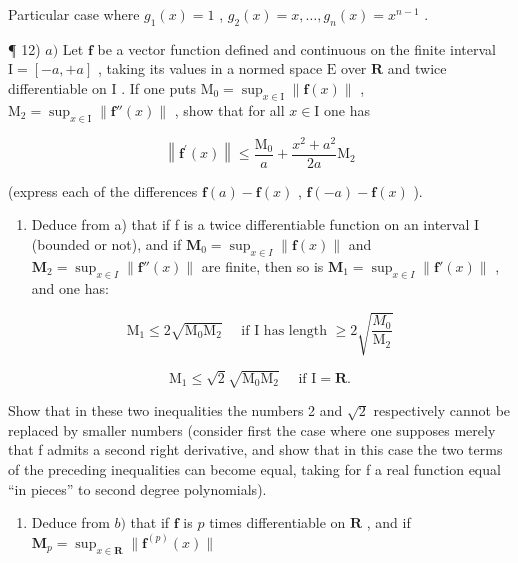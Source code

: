 Particular case where \(g_{1}(x)=1\) , \(g_{2}(x)=x,\ldots,g_{n}(x)=x^{n-1}\) .

¶ 12) \(a)\) Let \(\mathbf{f}\) be a vector function defined and continuous on the finite interval \(\mathrm{I} = [-a, + a]\) , taking its values in a normed space \(\mathrm{E}\) over \(\mathbf{R}\) and twice differentiable on \(\mathrm{I}\) . If one puts \(\mathrm{M}_0 = \sup_{x\in \mathrm{I}}\| \mathbf{f}(x)\|\) , \(\mathrm{M}_2 = \sup_{x\in \mathrm{I}}\| \mathbf{f}''(x)\|\) , show that for all \(x\in \mathrm{I}\) one has

\[
\left\| \mathbf {f} ^ {\prime} (x) \right\| \leqslant \frac {\mathrm{M} _ {0}}{a} + \frac {x ^ {2} + a ^ {2}}{2 a} \mathrm{M} _ {2}
\]

(express each of the differences \(\mathbf{f}(a) - \mathbf{f}(x)\) , \(\mathbf{f}(-a) - \mathbf{f}(x)\) ).

\begin{enumerate}
\def\labelenumi{\alph{enumi})}
\setcounter{enumi}{1}
\tightlist
\item
  Deduce from a) that if f is a twice differentiable function on an interval I (bounded or not), and if \(\mathbf{M}_{0} = \sup_{x \in I} \| \mathbf{f}(x) \|\) and \(\mathbf{M}_{2} = \sup_{x \in I} \| \mathbf{f}''(x) \|\) are finite, then so is \(\mathbf{M}_{1} = \sup_{x \in I} \| \mathbf{f}'(x) \|\) , and one has:
\end{enumerate}

\[
\mathrm{M} _ {1} \leqslant 2 \sqrt {\mathrm{M} _ {0} \mathrm{M} _ {2}} \quad \text { if   I   has   length } \geqslant 2 \sqrt {\frac {M _ {0}}{\mathrm{M} _ {2}}}
\]

\[
\mathrm{M} _ {1} \leqslant \sqrt {2} \sqrt {\mathrm{M} _ {0} \mathrm{M} _ {2}} \quad \text { if } \mathrm{I} = \mathbf {R}.
\]

Show that in these two inequalities the numbers 2 and \(\sqrt{2}\) respectively cannot be replaced by smaller numbers (consider first the case where one supposes merely that f admits a second right derivative, and show that in this case the two terms of the preceding inequalities can become equal, taking for f a real function equal ``in pieces'' to second degree polynomials).

\begin{enumerate}
\def\labelenumi{\alph{enumi})}
\setcounter{enumi}{2}
\tightlist
\item
  Deduce from \(b)\) that if \(\mathbf{f}\) is \(p\) times differentiable on \(\mathbf{R}\) , and if \(\mathbf{M}_p = \sup_{x \in \mathbf{R}} \| \mathbf{f}^{(p)}(x) \|\)
\end{enumerate}

